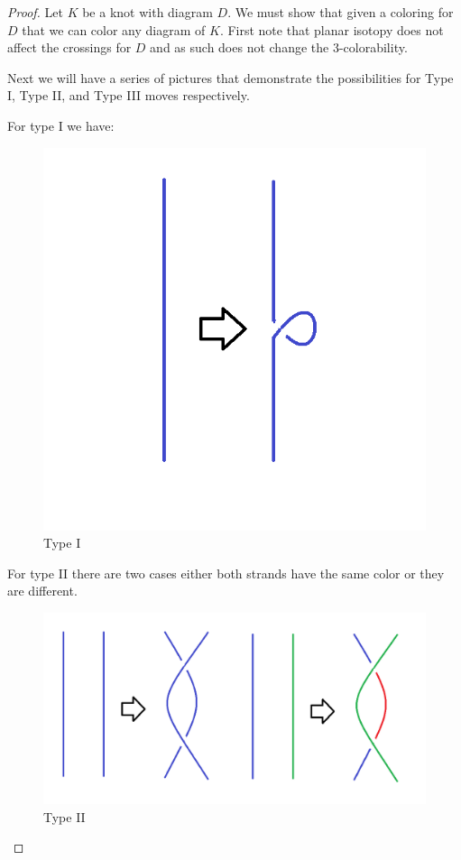 \documentclass[12pt]{amsart}
\theoremstyle{definition}
\theoremstyle{remark}
\numberwithin{equation}{section}
\newcommand{\ds}{.3}
\begin{document}
\begin{proof}
  Let $K$ be a knot with diagram $D$. We must show that given a coloring
  for $D$ that we can color any diagram of $K$. First note that planar isotopy
  does not affect the crossings for $D$ and as such does not change the
  3-colorability.

  Next we will have a series of pictures that demonstrate the possibilities
  for Type I, Type II, and Type III moves respectively.

  For type I we have:
  \begin{figure}
    \includegraphics[scale=\ds]{t1-c}
    \caption{Type I}
    \label{fig:t1-c}
  \end{figure}
  
  For type II there are two cases either both strands have the same color
  or they are different.
  \begin{figure}
    \includegraphics[scale=\ds]{t2-c}
    \caption{Type II}
    \label{fig:t2-c}
  \end{figure}


\end{proof}
\end{document}
